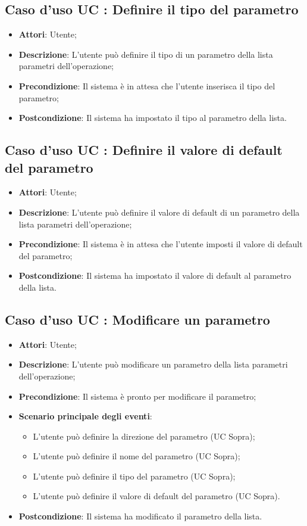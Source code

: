 \documentclass[../AnalisiDeiRequisiti.tex]{subfiles}
\begin{document}
		\subsection{Caso d'uso UC : Definire il tipo del parametro}
			\begin{itemize}
				\item \textbf{Attori}: Utente;
				\item \textbf{Descrizione}: L'utente può definire il tipo di un parametro
				della lista parametri dell'operazione;
				\item \textbf{Precondizione}: Il sistema è in attesa che l'utente inserisca
				il tipo del parametro;
				\item \textbf{Postcondizione}: Il sistema ha impostato il tipo al parametro
				della lista.
			\end{itemize}
		\subsection{Caso d'uso UC : Definire il valore di default del parametro}
			\begin{itemize}
				\item \textbf{Attori}: Utente;
				\item \textbf{Descrizione}: L'utente può definire il valore di default di un
				parametro della lista parametri dell'operazione;
				\item \textbf{Precondizione}: Il sistema è in attesa che l'utente imposti
				il valore di default del parametro;
				\item \textbf{Postcondizione}: Il sistema ha impostato il valore di default al
				parametro della lista.
			\end{itemize}
		\subsection{Caso d'uso UC : Modificare un parametro}
			\begin{itemize}
				\item \textbf{Attori}: Utente;
				\item \textbf{Descrizione}: L'utente può modificare un parametro della lista
				parametri dell'operazione;
				\item \textbf{Precondizione}: Il sistema è pronto per modificare il parametro;
				\item \textbf{Scenario principale degli eventi}:
					\begin{itemize}
						\item L'utente può definire la direzione del parametro (UC Sopra);
						\item L'utente può definire il nome del parametro (UC Sopra);
						\item L'utente può definire il tipo del parametro (UC Sopra);
						\item L'utente può definire il valore di default del parametro (UC Sopra).
					\end{itemize}
				\item \textbf{Postcondizione}: Il sistema ha modificato il parametro della
				lista.
			\end{itemize}
\end{document}
